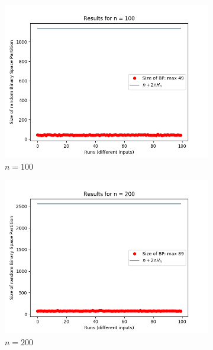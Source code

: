 \documentclass[letterpaper]{article}
\begin{document}
\begin{figure}[H]
\begin{subfigure}{.33\textwidth}
      \includegraphics[width=1\linewidth]{images/assign1/triangle/inputs_100}
      \caption{$n = 100$}
    \end{subfigure}
    \begin{subfigure}{.33\textwidth}
      \centering
      \includegraphics[width=1\linewidth]{images/assign1/triangle/inputs_200}
      \caption{$n = 200$}
    \end{subfigure}
    \begin{subfigure}{.33\textwidth}
      \centering

\end{subfigure}
\end{figure}
\end{document}
